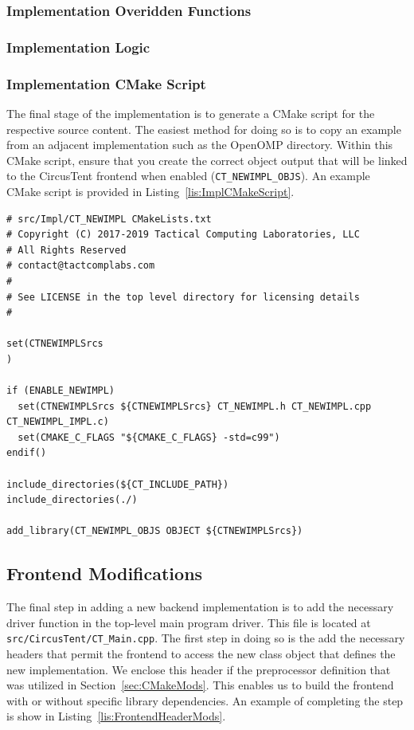 \documentclass{article}
\begin{document}
\subsubsection{Implementation Overidden Functions}

\subsubsection{Implementation Logic}

\subsubsection{Implementation CMake Script}

The final stage of the implementation is to generate a CMake script 
for the respective source content.  The easiest method for doing so 
is to copy an example from an adjacent implementation such as the OpenOMP 
directory.  Within this CMake script, ensure that you create the correct object output 
that will be linked to the CircusTent frontend when enabled (\texttt{CT\_NEWIMPL\_OBJS}).
An example CMake script is provided in Listing~\ref{lis:ImplCMakeScript}.    

\vspace{0.125in}
\begin{lstlisting}[frame=single,style=base,caption={Implementation CMake Script},captionpos=b,label={lis:ImplCMakeScript}]
# src/Impl/CT_NEWIMPL CMakeLists.txt
# Copyright (C) 2017-2019 Tactical Computing Laboratories, LLC
# All Rights Reserved
# contact@tactcomplabs.com
#
# See LICENSE in the top level directory for licensing details
#

set(CTNEWIMPLSrcs
)

if (ENABLE_NEWIMPL)
  set(CTNEWIMPLSrcs ${CTNEWIMPLSrcs} CT_NEWIMPL.h CT_NEWIMPL.cpp CT_NEWIMPL_IMPL.c)
  set(CMAKE_C_FLAGS "${CMAKE_C_FLAGS} -std=c99")
endif()

include_directories(${CT_INCLUDE_PATH})
include_directories(./)

add_library(CT_NEWIMPL_OBJS OBJECT ${CTNEWIMPLSrcs})
\end{lstlisting}

\clearpage
\subsection{Frontend Modifications}
\label{sec:FrontendMods}

The final step in adding a new backend implementation is to add the necessary 
driver function in the top-level main program driver.  This file is located 
at \texttt{src/CircusTent/CT\_Main.cpp}.  The first step in doing so is the add
the necessary headers that permit the frontend to access the new class object 
that defines the new implementation.  We enclose this header if the preprocessor 
definition that was utilized in Section~\ref{sec:CMakeMods}.  This enables us to build 
the frontend with or without specific library dependencies.  An example of completing 
the step is show in Listing~\ref{lis:FrontendHeaderMods}.  
\end{document}
